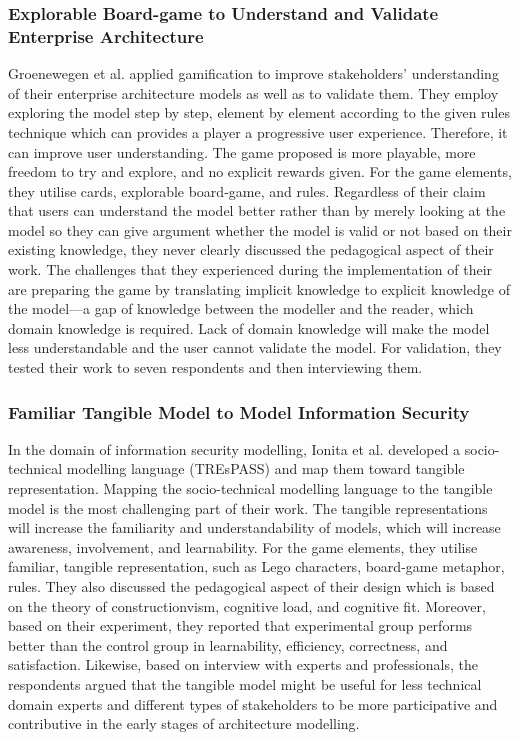 \documentclass[12pt, a4paper]{report}
\begin{document}
\subsubsection{Explorable Board-game to Understand and Validate Enterprise Architecture}
Groenewegen et al. \cite{Groenewegen2010} applied gamification to improve stakeholders' understanding of their enterprise architecture models as well as to validate them.
They employ exploring the model step by step, element by element according to the given rules technique which can provides a player a progressive user experience. Therefore, it can improve user understanding. The game proposed is more playable, more freedom to try and explore, and no explicit rewards given. For the game elements, they utilise cards, explorable board-game, and rules. 
Regardless of their claim that users can understand the model better rather than by merely looking at the model so they can give argument whether the model is valid or not based on their existing knowledge, they never clearly discussed the pedagogical aspect of their work. The challenges that they experienced during the implementation of their are preparing the game by translating implicit knowledge to explicit knowledge of the model—a gap of knowledge between the modeller and the reader, which domain knowledge is required. Lack of domain knowledge will make the model less understandable and the user cannot validate the model. For validation, they tested their work to seven respondents and then interviewing them. 

\subsubsection{Familiar Tangible Model to Model Information Security}
In the domain of information security modelling, Ionita et al.\cite{Ionita2015} developed a socio-technical modelling language (TREsPASS) and map them toward tangible representation. Mapping the socio-technical modelling language to the tangible model is the most challenging part of their work. The tangible representations will increase the familiarity and understandability of models, which will increase awareness, involvement, and learnability. For the game elements, they utilise familiar, tangible representation, such as Lego characters, board-game metaphor, rules. They also discussed the pedagogical aspect of their design which is based on the theory of constructionvism, cognitive load, and cognitive fit. Moreover, based on their experiment, they reported that experimental group performs better than the control group in learnability, efficiency, correctness, and satisfaction. Likewise, based on interview with experts and professionals, the respondents argued that the tangible model might be useful for less technical domain experts and different types of stakeholders to be more participative and contributive in the early stages of architecture modelling.
\end{document}
